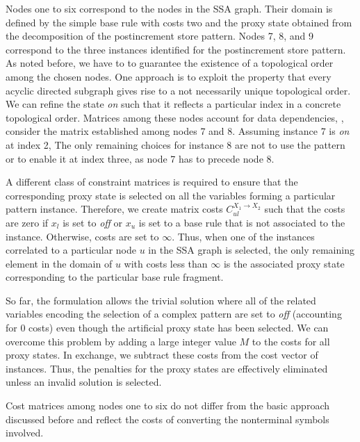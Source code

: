 Nodes one to six correspond to the nodes in the SSA graph. Their
domain is defined by the simple base rule with costs two and the proxy
state obtained from the decomposition of the postincrement store
pattern. Nodes 7, 8, and 9 correspond to the three instances
identified for the postincrement store pattern. As noted before, we
have to to guarantee the existence of a topological order among the
chosen nodes.  One approach is to exploit the property that every
acyclic directed subgraph gives rise to a not necessarily unique
topological order.  We can refine the state \textit{on} such that it
reflects a particular index in a concrete topological order. Matrices
among these nodes account for data dependencies, \eg, consider the
matrix established among nodes 7 and 8. Assuming instance 7 is
\textit{on} at index 2, The only remaining choices for instance 8 are
not to use the pattern or to enable it at index three, as node 7 has
to precede node 8.

A different class of constraint matrices is required to ensure that
the corresponding proxy state is selected on all the variables forming
a particular pattern instance. Therefore, we create matrix costs
$C^{X_1 \rightarrow X_2}_{ul}$ such that the costs are zero if $x_l$
is set to \textit{off\/} or $x_u$ is set to a base rule that is not
associated to the instance. Otherwise, costs are set to $\infty$.
Thus, when one of the instances correlated to a particular node $u$ in
the SSA graph is selected, the only remaining element in the domain of
$u$ with costs less than $\infty$ is the associated proxy state
corresponding to the particular base rule fragment.

So far, the formulation allows the trivial solution where all of the
related variables encoding the selection of a complex pattern are set
to \textit{off} (accounting for 0 costs) even though the artificial
proxy state has been selected. We can overcome this problem by adding
a large integer value $M$ to the costs for all proxy states. In
exchange, we subtract these costs from the cost vector of
instances. Thus, the penalties for the proxy states are effectively
eliminated unless an invalid solution is selected.

Cost matrices among nodes one to six do not differ from the basic
approach discussed before and reflect the costs of converting the
nonterminal symbols involved.

